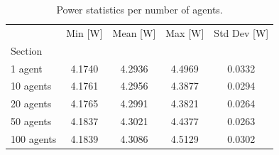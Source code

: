 \begin{table}[H]
\caption{Power statistics per number of agents.}
\label{tab:power_agents}
\begin{tabular}{lcccc}
\toprule
 & Min [W] & Mean [W] & Max [W] & Std Dev [W] \\
Section &  &  &  &  \\
\midrule
1 agent & 4.1740 & 4.2936 & 4.4969 & 0.0332 \\
10 agents & 4.1761 & 4.2956 & 4.3877 & 0.0294 \\
20 agents & 4.1765 & 4.2991 & 4.3821 & 0.0264 \\
50 agents & 4.1837 & 4.3021 & 4.4377 & 0.0263 \\
100 agents & 4.1839 & 4.3086 & 4.5129 & 0.0302 \\
\bottomrule
\end{tabular}
\end{table}
